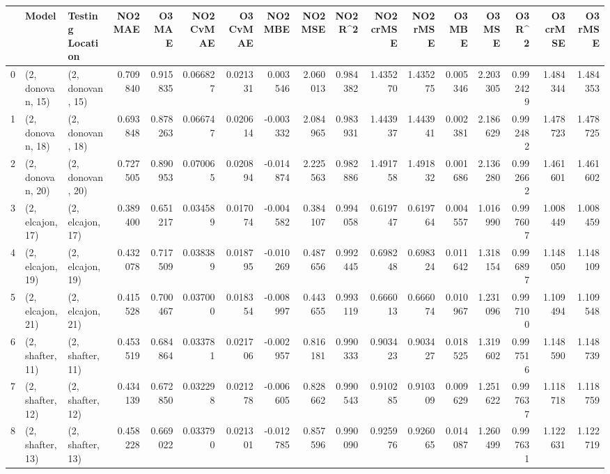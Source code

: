 \begin{tabular}{lllrrrrrrrrrrrrrr}
\toprule
{} &             Model &  Testing Location &   NO2 MAE &    O3 MAE &  NO2 CvMAE &  O3 CvMAE &   NO2 MBE &   NO2 MSE &   NO2 R\textasciicircum2 &  NO2 crMSE &  NO2 rMSE &    O3 MBE &     O3 MSE &    O3 R\textasciicircum2 &  O3 crMSE &   O3 rMSE \\
\midrule
0  &  (2, donovan, 15) &  (2, donovan, 15) &  0.709840 &  0.915835 &   0.066827 &  0.021331 &  0.003546 &  2.060013 &  0.984382 &   1.435270 &  1.435275 &  0.005346 &   2.203305 &  0.992429 &  1.484344 &  1.484353 \\
1  &  (2, donovan, 18) &  (2, donovan, 18) &  0.693848 &  0.878263 &   0.066747 &  0.020614 & -0.003332 &  2.084965 &  0.983931 &   1.443937 &  1.443941 &  0.002381 &   2.186629 &  0.992482 &  1.478723 &  1.478725 \\
2  &  (2, donovan, 20) &  (2, donovan, 20) &  0.727505 &  0.890953 &   0.070065 &  0.020894 & -0.014874 &  2.225563 &  0.982886 &   1.491758 &  1.491832 &  0.001686 &   2.136280 &  0.992662 &  1.461601 &  1.461602 \\
3  &  (2, elcajon, 17) &  (2, elcajon, 17) &  0.389400 &  0.651217 &   0.034589 &  0.017074 & -0.004582 &  0.384107 &  0.994058 &   0.619747 &  0.619764 &  0.004557 &   1.016990 &  0.997607 &  1.008449 &  1.008459 \\
4  &  (2, elcajon, 19) &  (2, elcajon, 19) &  0.432078 &  0.717509 &   0.038389 &  0.018795 & -0.010269 &  0.487656 &  0.992445 &   0.698248 &  0.698324 &  0.011642 &   1.318154 &  0.996897 &  1.148050 &  1.148109 \\
5  &  (2, elcajon, 21) &  (2, elcajon, 21) &  0.415528 &  0.700467 &   0.037000 &  0.018354 & -0.008997 &  0.443655 &  0.993119 &   0.666013 &  0.666074 &  0.010967 &   1.231096 &  0.997100 &  1.109494 &  1.109548 \\
6  &  (2, shafter, 11) &  (2, shafter, 11) &  0.453519 &  0.684864 &   0.033781 &  0.021706 & -0.002957 &  0.816181 &  0.990333 &   0.903423 &  0.903427 &  0.018525 &   1.319602 &  0.997516 &  1.148590 &  1.148739 \\
7  &  (2, shafter, 12) &  (2, shafter, 12) &  0.434139 &  0.672850 &   0.032298 &  0.021278 & -0.006605 &  0.828662 &  0.990543 &   0.910285 &  0.910309 &  0.009629 &   1.251622 &  0.997637 &  1.118718 &  1.118759 \\
8  &  (2, shafter, 13) &  (2, shafter, 13) &  0.458228 &  0.669022 &   0.033790 &  0.021301 & -0.012785 &  0.857596 &  0.990090 &   0.925976 &  0.926065 &  0.014087 &   1.260499 &  0.997631 &  1.122631 &  1.122719 \\

\end{tabular}
